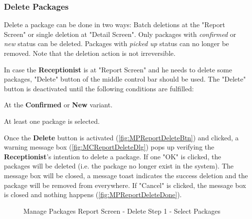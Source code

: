 \subsubsection{Delete Packages}

Delete a package can be done in two ways: Batch deletions at the "Report Screen" or single deletion at "Detail Screen". Only packages with \textit{confirmed} or \textit{new} status can be deleted. Packages with \textit{picked up} status can no longer be removed. Note that the deletion action is not irreversible.

\bigskip

In case the \textbf{Receptionist} is at "Report Screen" and he needs to delete some packages, 
"Delete" button of the middle control bar should be used. The "Delete" button is deactivated until the following conditions are fulfilled:

\begin{compactenum}
    \item At the \textbf{Confirmed} or \textbf{New} variant.
    \item At least one package is selected.
\end{compactenum}

\bigskip
Once the \textbf{Delete} button is activated (\autoref{fig:MPReportDeleteBtn}) and clicked, a warning message box (\autoref{fig:MCReportDeleteDlg}) pops up verifying the \textbf{Receptionist}'s intention to delete a package. If one "OK" is clicked, the packages will be deleted (i.e. the package no longer exist in the system). The message box will be closed, a message toast indicates the success deletion and the package will be removed from everywhere. If "Cancel" is clicked, the message box is closed and nothing happens (\autoref{fig:MPReportDeleteDone}). 

\begin{figure}[H]
	\centering

    \caption{Manage Packages Report Screen - Delete Step 1 - Select Packages}
	\label{fig:MPReportDeleteBtn}
\end{figure}


